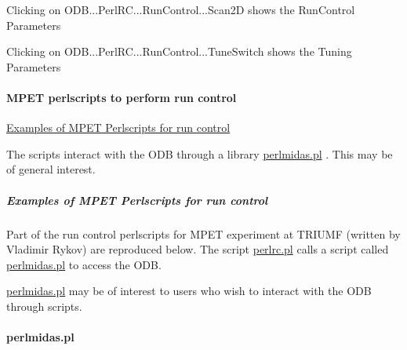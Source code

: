 \begin{DoxyItemize}
\item Clicking on ODB...PerlRC...RunControl...Scan2D shows the RunControl Parameters 
\item Clicking on ODB...PerlRC...RunControl...TuneSwitch shows the Tuning Parameters 
\end{DoxyItemize}

\par
 

 \par
\hypertarget{RC_mhttpd_defining_script_buttons_RC_odb_script_ex2_perlscript}{}\paragraph{MPET perlscripts to perform run control}\label{RC_mhttpd_defining_script_buttons_RC_odb_script_ex2_perlscript}

\begin{DoxyItemize}
\item \hyperlink{RC_mhttpd_perlrc}{Examples of MPET Perlscripts for run control}
\end{DoxyItemize}

The scripts interact with the ODB through a library \hyperlink{RC_mhttpd_perlrc_RC_mhttpd_perlmidas_script}{perlmidas.pl} . This may be of general interest.



\par
 \label{index_end}
\hypertarget{index_end}{}
 \subparagraph{Examples of MPET Perlscripts for run control}\label{RC_mhttpd_perlrc}
\par


 \label{RC_mhttpd_perlrc_idx_script_perlmidas}
\hypertarget{RC_mhttpd_perlrc_idx_script_perlmidas}{}


Part of the run control perlscripts for MPET experiment at TRIUMF (written by Vladimir Rykov) are reproduced below. The script \hyperlink{RC_mhttpd_perlrc_RC_mhttpd_perlrc_script}{perlrc.pl} calls a script called \hyperlink{RC_mhttpd_perlrc_RC_mhttpd_perlmidas_script}{perlmidas.pl} to access the ODB.

\hyperlink{RC_mhttpd_perlrc_RC_mhttpd_perlmidas_script}{perlmidas.pl} may be of interest to users who wish to interact with the ODB through scripts.\hypertarget{RC_mhttpd_perlrc_RC_mhttpd_perlmidas_script}{}\paragraph{perlmidas.pl}\label{RC_mhttpd_perlrc_RC_mhttpd_perlmidas_script}

